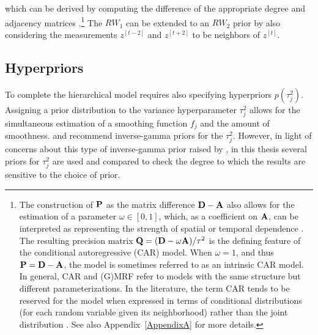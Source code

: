 \noindent which can be derived by computing the difference of the appropriate degree 
and adjacency matrices .\footnote{The construction 
of $\mathbf{P}$ as the matrix difference $\mathbf{D} - \mathbf{A}$ also allows for the estimation 
of a parameter $\omega \in [0,1]$, which, as a coefficient on $\mathbf{A}$, can be 
interpreted as representing the strength of spatial or temporal dependence 
. The resulting precision matrix 
$\mathbf{Q}= (\mathbf{D} - \omega \mathbf{A})/\tau^2$ is the defining feature of the conditional 
autoregressive (CAR) model.  When $\omega = 1$, and thus $\mathbf{P}= \mathbf{D} - \mathbf{A}$, 
the model is sometimes referred to as an intrinsic CAR model. In general, CAR and (G)MRF 
refer to models with the same structure but different parameterizations. In the literature, the 
term CAR tends to be reserved for the model when expressed in terms of conditional 
distributions (for each random variable given its neighborhood) rather than the joint distribution . 
See also Appendix~\ref{AppendixA} for more details.\label{footnote_car}} 
The $RW_1$ can be extended to an $RW_2$ prior by also considering the 
measurements $z^{[t-2]}$  and $z^{[t+2]}$ to be neighbors of $z^{[t]}$. 


\subsection{Hyperpriors}
\label{hyperpriors}

To complete the hierarchical model requires also specifying hyperpriors $p(\tau_j^2)$.  
Assigning a prior distribution to the variance hyperparameter $\tau_j^2$ allows for the 
simultaneous estimation of a smoothing function $f_j$ and the amount of smoothness.
  and  recommend  
 inverse-gamma priors for the $\tau_j^2$. However, in light of concerns about this type 
 of inverse-gamma prior raised by , in this thesis several priors 
 for $\tau^2_j$ are used and compared to check the degree to which the results are 
 sensitive to the choice of prior.

